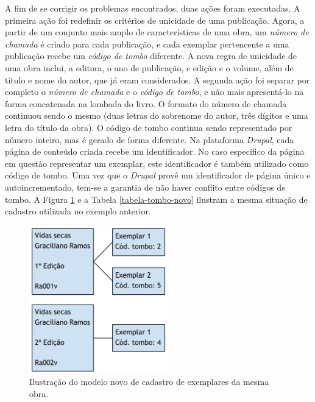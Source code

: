 \documentclass[a4paper]{article}
\begin{document}
A fim de se corrigir os problemas encontrados, duas ações foram executadas. A primeira ação foi redefinir os critérios de unicidade de uma publicação. Agora, a partir de um conjunto mais amplo de características de uma obra, um \textit{número de chamada} é criado para cada publicação, e cada exemplar pertencente a uma publicação recebe um \textit{código de tombo} diferente. A nova regra de unicidade de uma obra inclui, a editora, o ano de publicação, e edição e o volume, além de título e nome do autor, que já eram considerados. A segunda ação foi separar por completo o \textit{número de chamada} e o \textit{código de tombo}, e não mais apresentá-lo na forma concatenada na lombada do livro. O formato do número de chamada continuou sendo o mesmo (duas letras do sobrenome do autor, três dígitos e uma letra do título da obra). O código de tombo continua sendo representado por número inteiro, mas é gerado de forma diferente. Na plataforma \textit{Drupal}, cada página de conteúdo criada recebe um identificador. No caso específico da página em questão representar um exemplar, este identificador é também utilizado como código de tombo. Uma vez que o \textit{Drupal} provê um identificador de página único e autoincrementado, tem-se a garantia de não haver conflito entre códigos de tombo. A Figura \ref{tombo-novo} e a Tabela \ref{tabela-tombo-novo} ilustram a mesma situação de cadastro utilizada no exemplo anterior.

\begin{figure}[pbth!]
\centering
\includegraphics[width=60mm]{img/tombo-novo.png}
\caption{Ilustração do modelo novo de cadastro de exemplares da mesma obra.\label{tombo-novo}}
\end{figure}
\end{document}
